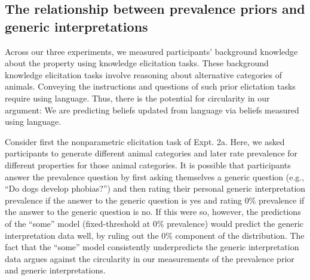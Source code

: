 \documentclass[,man,floatsintext]{apa6}
\theoremstyle{definition}
\theoremstyle{definition}
\theoremstyle{definition}
\theoremstyle{remark}
\begin{document}
\hypertarget{the-relationship-between-prevalence-priors-and-generic-interpretations}{%
\subsection{The relationship between prevalence priors and generic
interpretations}\label{the-relationship-between-prevalence-priors-and-generic-interpretations}}

Across our three experiments, we measured participants' background
knowledge about the property using knowledge elicitation tasks. These
background knowledge elicitation tasks involve reasoning about
alternative categories of animals. Conveying the instructions and
questions of such prior elictation tasks require using language. Thus,
there is the potential for circularity in our argument: We are
predicting beliefs updated from language via beliefs measured using
language.

Consider first the nonparametric elicitation task of Expt. 2a. Here, we
asked participants to generate different animal categories and later
rate prevalence for different properties for those animal categories. It
is possible that participants answer the prevalence question by first
asking themselves a generic question (e.g., \enquote{Do dogs develop
phobias?}) and then rating their personal generic interpretation
prevalence if the answer to the generic question is yes and rating 0\%
prevalence if the answer to the generic question is no. If this were so,
however, the predictions of the \enquote{some} model (fixed-threshold at
0\% prevalence) would predict the generic interpretation data well, by
ruling out the 0\% component of the distribution. The fact that the
\enquote{some} model consistently underpredicts the generic
interpretation data argues against the circularity in our measurements
of the prevalence prior and generic interpretations.
\end{document}
